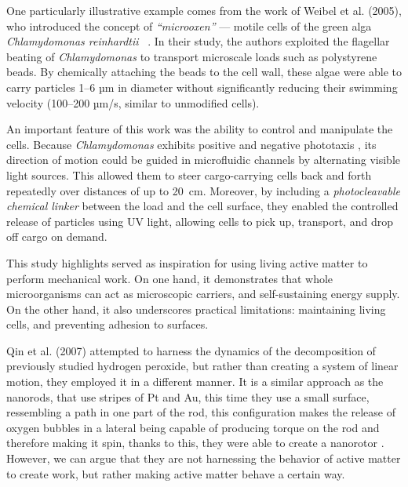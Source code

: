 One particularly illustrative example comes from the work of Weibel et al. (2005), who introduced the concept of \textit{``microoxen''} --- motile cells of the green alga \textit{Chlamydomonas reinhardtii} ~\cite{weibel2005microoxen}. In their study, the authors exploited the flagellar beating of \textit{Chlamydomonas} to transport microscale loads such as polystyrene beads. By chemically attaching the beads to the cell wall, these algae were able to carry particles 1--6 µm in diameter without significantly reducing their swimming velocity (100–200 µm/s, similar to unmodified cells). 

An important feature of this work was the ability to control and manipulate the cells. Because \textit{Chlamydomonas} exhibits positive and negative phototaxis \cite{bennett2015steering}, its direction of motion could be guided in microfluidic channels by alternating visible light sources. This allowed them to steer cargo-carrying cells back and forth repeatedly over distances of up to 20~cm. Moreover, by including a \textit{photocleavable chemical linker} between the load and the cell surface, they enabled the controlled release of particles using UV light, allowing cells to pick up, transport, and drop off cargo on demand.

This study highlights served as inspiration for using living active matter to perform mechanical work. On one hand, it demonstrates that whole microorganisms can act as microscopic carriers, and self-sustaining energy supply. On the other hand, it also underscores practical limitations: maintaining living cells, and preventing adhesion to surfaces.

 Qin et al. (2007) attempted to harness the dynamics of the decomposition of previously studied hydrogen peroxide, but rather than creating a system of linear motion, they employed it in a different manner. It is a similar approach as the nanorods, that use stripes of Pt and Au, this time they use a small surface, ressembling a path in one part of the rod, this configuration makes the release of oxygen bubbles in a lateral being capable of producing torque on the rod and therefore making it spin, thanks to this, they were able to create a nanorotor \cite{qin2007rational}. However, we can argue that they are not harnessing the behavior of active matter to create work, but rather making active matter behave a certain way.

